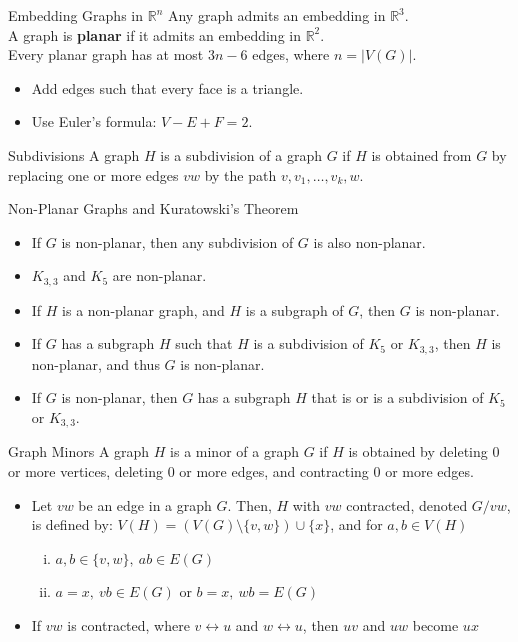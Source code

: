 \documentclass[10pt]{extarticle}
\begin{document}
  \begin{problem}{Embedding Graphs in $\mathbb{R}^n$}
    Any graph admits an embedding in $ \mathbb{R}^3$.\\

    A graph is \textbf{planar} if it admits an embedding in $\mathbb{R}^2$.\\

    Every planar graph has at most $3n-6$ edges, where $n = |V(G)|$.
    \begin{itemize}
      \item Add edges such that every face is a triangle.
      \item Use Euler's formula: $V - E + F = 2$.
    \end{itemize}
  \end{problem}
  \begin{problem}{Subdivisions}
    A graph $H$ is a subdivision of a graph $G$ if $H$ is obtained from $G$ by replacing one or more edges $vw$ by the path $v,v_1,\dots,v_k,w$.
  \end{problem}
  \begin{problem}{Non-Planar Graphs and Kuratowski's Theorem}
    \begin{itemize}
      \item If $G$ is non-planar, then any subdivision of $G$ is also non-planar.
      \item $K_{3,3}$ and $K_5$ are non-planar.
      \item If $H$ is a non-planar graph, and $H$ is a subgraph of $G$, then $G$ is non-planar.
      \item If $G$ has a subgraph $H$ such that $H$ is a subdivision of $K_{5}$ or $K_{3,3}$, then $H$ is non-planar, and thus $G$ is non-planar.
      \item If $G$ is non-planar, then $G$ has a subgraph $H$ that is or is a subdivision of $K_{5}$ or $K_{3,3}$.
    \end{itemize}
  \end{problem}
  \begin{problem}{Graph Minors}
    A graph $H$ is a minor of a graph $G$ if $H$ is obtained by deleting $0$ or more vertices, deleting $0$ or more edges, and contracting $0$ or more edges.
    \begin{itemize}
      \item Let $vw$ be an edge in a graph $G$. Then, $H$ with $vw$ contracted, denoted $G/vw$, is defined by: $V(H) = \left(V(G) \setminus \{v,w\}\right)\cup \{x\}$, and for $a,b\in V(H)$
        \begin{enumerate}[(i)]
          \item $a,b\in \{v,w\},~ab\in E(G)$
          \item $a=x,~vb\in E(G)$ or $b=x,~wb = E(G)$
        \end{enumerate}
      \item If $vw$ is contracted, where $v\leftrightarrow u$ and $w \leftrightarrow u$, then $uv$ and $uw$ become $ux$
    \end{itemize}
  \end{problem}
\end{document}
